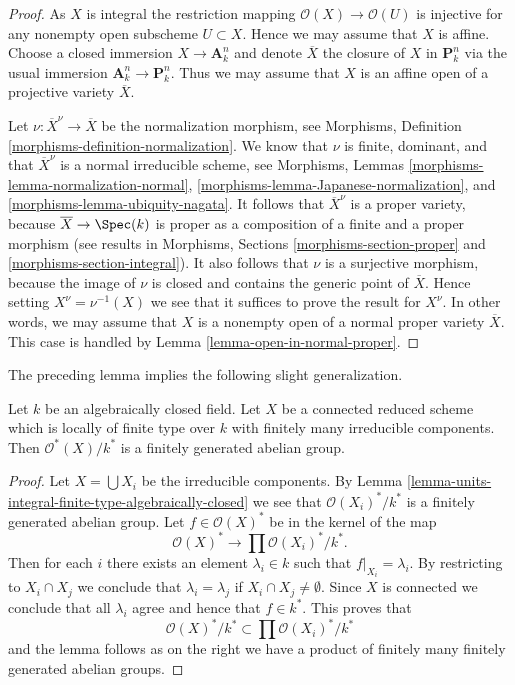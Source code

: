 \begin{proof}
As $X$ is integral the restriction mapping
$\mathcal{O}(X) \to \mathcal{O}(U)$ is injective for any
nonempty open subscheme $U \subset X$. Hence we may assume
that $X$ is affine. Choose a closed immersion
$X \to \mathbf{A}^n_k$
and denote $\overline{X}$ the closure of $X$ in $\mathbf{P}^n_k$
via the usual immersion $\mathbf{A}^n_k \to \mathbf{P}^n_k$.
Thus we may assume that $X$ is an affine open of a projective
variety $\overline{X}$.

\medskip\noindent
Let $\nu : \overline{X}^\nu \to \overline{X}$ be the normalization
morphism, see
Morphisms, Definition \ref{morphisms-definition-normalization}.
We know that $\nu$ is finite, dominant, and that $\overline{X}^\nu$
is a normal irreducible scheme, see
Morphisms, Lemmas \ref{morphisms-lemma-normalization-normal},
\ref{morphisms-lemma-Japanese-normalization}, and
\ref{morphisms-lemma-ubiquity-nagata}.
It follows that $\overline{X}^\nu$ is a proper variety,
because $\overline{X} \to \Spec(k)$ is proper as a composition
of a finite and a proper morphism (see results in
Morphisms, Sections \ref{morphisms-section-proper} and
\ref{morphisms-section-integral}).
It also follows that $\nu$ is a surjective morphism, because
the image of $\nu$ is closed and contains the generic point of $\overline{X}$.
Hence setting $X^\nu = \nu^{-1}(X)$ we see that it suffices to prove the
result for $X^\nu$. In other words, we may assume that $X$ is a nonempty
open of a normal proper variety $\overline{X}$. This case is handled by
Lemma \ref{lemma-open-in-normal-proper}.
\end{proof}

\noindent
The preceding lemma implies the following slight generalization.

\begin{lemma}
\label{lemma-units-general-algebraically-closed}
Let $k$ be an algebraically closed field.
Let $X$ be a connected reduced scheme which is locally of finite type
over $k$ with finitely many irreducible components.
Then $\mathcal{O}^*(X)/k^*$ is a finitely generated abelian group.
\end{lemma}

\begin{proof}
Let $X = \bigcup X_i$ be the irreducible components. By
Lemma \ref{lemma-units-integral-finite-type-algebraically-closed}
we see that $\mathcal{O}(X_i)^*/k^*$ is a finitely generated
abelian group. Let $f \in \mathcal{O}(X)^*$ be in the kernel
of the map
$$
\mathcal{O}(X)^* \longrightarrow \prod \mathcal{O}(X_i)^*/k^*.
$$
Then for each $i$ there exists an element $\lambda_i \in k$
such that $f|_{X_i} = \lambda_i$.
By restricting to $X_i \cap X_j$ we conclude that
$\lambda_i = \lambda_j$ if $X_i \cap X_j \not = \emptyset$.
Since $X$ is connected we conclude that all $\lambda_i$ agree
and hence that $f \in k^*$. This proves that
$$
\mathcal{O}(X)^*/k^* \subset \prod \mathcal{O}(X_i)^*/k^*
$$
and the lemma follows as on the right we have a product of finitely
many finitely generated abelian groups.
\end{proof}

